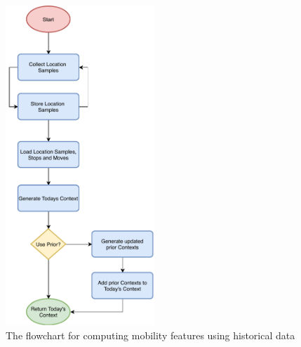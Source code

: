 \begin{figure}
    \centering
    \includegraphics[width=0.5\textwidth]{images/diagrams/api-flowchart.pdf}
    \caption{The flowchart for computing mobility features using historical data}
    \label{fig:flowchart-features}
\end{figure}


